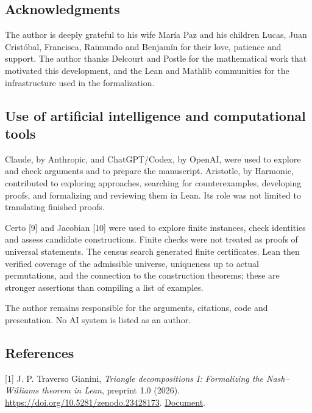\documentclass[english,11pt,a4paper]{article}
\begin{document}
\subsection{Acknowledgments}\label{acknowledgments}

The author is deeply grateful to his wife María Paz and his children Lucas, Juan Cristóbal, Francisca, Raimundo and Benjamín for their love, patience and support. The author thanks Delcourt and Postle for the mathematical work that motivated this development, and the Lean and Mathlib communities for the infrastructure used in the formalization.

\subsection{Use of artificial intelligence and computational tools}\label{use-of-artificial-intelligence-and-computational-tools}

Claude, by Anthropic, and ChatGPT/Codex, by OpenAI, were used to explore and check arguments and to prepare the manuscript. Aristotle, by Harmonic, contributed to exploring approaches, searching for counterexamples, developing proofs, and formalizing and reviewing them in Lean. Its role was not limited to translating finished proofs.

Certo {[}9{]} and Jacobian {[}10{]} were used to explore finite instances, check identities and assess candidate constructions. Finite checks were not treated as proofs of universal statements. The census search generated finite certificates. Lean then verified coverage of the admissible universe, uniqueness up to actual permutations, and the connection to the construction theorems; these are stronger assertions than compiling a list of examples.

The author remains responsible for the arguments, citations, code and presentation. No AI system is listed as an author.

\subsection{References}\label{references}

\begingroup\small\raggedright
\setlength{\parskip}{3pt}

{[}1{]} J. P. Traverso Gianini, \emph{Triangle decompositions I: Formalizing the Nash--Williams theorem in Lean}, preprint 1.0 (2026). \url{https://doi.org/10.5281/zenodo.23428173}. \href{https://github.com/jtraverso/nash-williams-triangle-decompositions-release/blob/main/preprints/PAPER_I/01_manuscript/PAPER_I_preprint_v1.0_en.md}{Document}.
\end{document}
